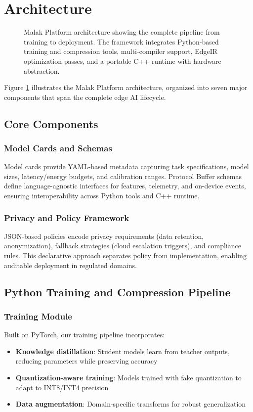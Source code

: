 \section{Architecture}

\begin{figure}[t]
\centering
\resizebox{0.95\textwidth}{!}{}
\caption{Malak Platform architecture showing the complete pipeline from training to deployment. The framework integrates Python-based training and compression tools, multi-compiler support, EdgeIR optimization passes, and a portable C++ runtime with hardware abstraction.}
\label{fig:architecture}
\end{figure}

Figure \ref{fig:architecture} illustrates the Malak Platform architecture, organized into seven major components that span the complete edge AI lifecycle.

\subsection{Core Components}

\subsubsection{Model Cards and Schemas}
Model cards provide YAML-based metadata capturing task specifications, model sizes, latency/energy budgets, and calibration ranges. Protocol Buffer schemas define language-agnostic interfaces for features, telemetry, and on-device events, ensuring interoperability across Python tools and C++ runtime.

\subsubsection{Privacy and Policy Framework}
JSON-based policies encode privacy requirements (data retention, anonymization), fallback strategies (cloud escalation triggers), and compliance rules. This declarative approach separates policy from implementation, enabling auditable deployment in regulated domains.

\subsection{Python Training and Compression Pipeline}

\subsubsection{Training Module}
Built on PyTorch, our training pipeline incorporates:
\begin{itemize}
\item \textbf{Knowledge distillation}: Student models learn from teacher outputs, reducing parameters while preserving accuracy
\item \textbf{Quantization-aware training}: Models trained with fake quantization to adapt to INT8/INT4 precision
\item \textbf{Data augmentation}: Domain-specific transforms for robust generalization
\end{itemize}

